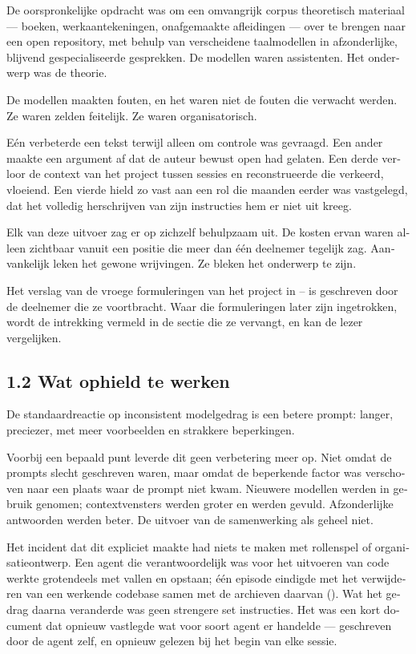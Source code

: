 \begin{dutch}
De oorspronkelijke opdracht was om een omvangrijk corpus theoretisch materiaal — boeken, werkaantekeningen, onafgemaakte afleidingen — over te brengen naar een open repository, met behulp van verscheidene taalmodellen in afzonderlijke, blijvend gespecialiseerde gesprekken. De modellen waren assistenten. Het onderwerp was de theorie.

De modellen maakten fouten, en het waren niet de fouten die verwacht werden. Ze waren zelden feitelijk. Ze waren organisatorisch.

Eén verbeterde een tekst terwijl alleen om controle was gevraagd. Een ander maakte een argument af dat de auteur bewust open had gelaten. Een derde verloor de context van het project tussen sessies en reconstrueerde die verkeerd, vloeiend. Een vierde hield zo vast aan een rol die maanden eerder was vastgelegd, dat het volledig herschrijven van zijn instructies hem er niet uit kreeg.

Elk van deze uitvoer zag er op zichzelf behulpzaam uit. De kosten ervan waren alleen zichtbaar vanuit een positie die meer dan één deelnemer tegelijk zag. Aanvankelijk leken het gewone wrijvingen. Ze bleken het onderwerp te zijn.

Het verslag van de vroege formuleringen van het project in – is geschreven door de deelnemer die ze voortbracht. Waar die formuleringen later zijn ingetrokken, wordt de intrekking vermeld in de sectie die ze vervangt, en kan de lezer vergelijken.


\subsection*{1.2 Wat ophield te werken}
\label{sec:nl:1.2}

De standaardreactie op inconsistent modelgedrag is een betere prompt: langer, preciezer, met meer voorbeelden en strakkere beperkingen.

Voorbij een bepaald punt leverde dit geen verbetering meer op. Niet omdat de prompts slecht geschreven waren, maar omdat de beperkende factor was verschoven naar een plaats waar de prompt niet kwam. Nieuwere modellen werden in gebruik genomen; contextvensters werden groter en werden gevuld. Afzonderlijke antwoorden werden beter. De uitvoer van de samenwerking als geheel niet.

Het incident dat dit expliciet maakte had niets te maken met rollenspel of organisatieontwerp. Een agent die verantwoordelijk was voor het uitvoeren van code werkte grotendeels met vallen en opstaan; één episode eindigde met het verwijderen van een werkende codebase samen met de archieven daarvan (). Wat het gedrag daarna veranderde was geen strengere set instructies. Het was een kort document dat opnieuw vastlegde wat voor soort agent er handelde — geschreven door de agent zelf, en opnieuw gelezen bij het begin van elke sessie.


\end{dutch}
